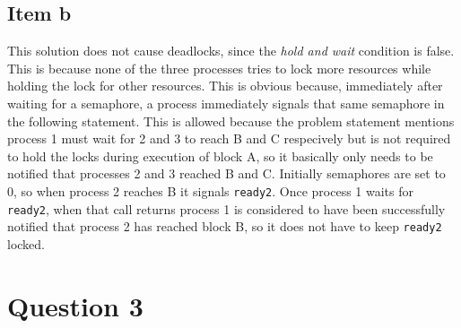 {\subsection{Item b}
This solution does not cause deadlocks, since the \emph{hold and wait} condition is false. This is because none of the three processes tries to lock more resources while holding the lock for other resources. This is obvious because, immediately after waiting for a semaphore, a process immediately signals that same semaphore in the following statement. This is allowed because the problem statement mentions process 1 must wait for 2 and 3 to reach B and C respecively but is not required to hold the locks during execution of block A, so it basically only needs to be notified that processes 2 and 3 reached B and C. Initially semaphores are set to 0, so when process 2 reaches B it signals \texttt{ready2}. Once process 1 waits for \texttt{ready2}, when that call returns process 1 is considered to have been successfully notified that process 2 has reached block B, so it does not have to keep \texttt{ready2} locked.

\section{Question 3}

}
